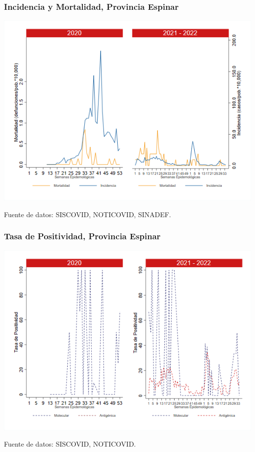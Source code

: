 \documentclass[xcolor=table]{beamer}
\begin{document}
\begin{frame}[label=Espinar]
	\frametitle{Incidencia y Mortalidad, Provincia Espinar}
	\vspace{-.5cm}
	\begin{center}
		\includegraphics[width=0.8\linewidth, trim={0cm .5cm 0cm 0.2cm},clip]{../figuras/incidencia_mortalidad_20_21_8.png}
	\end{center}
	{\tiny Fuente de datos: SISCOVID, NOTICOVID, SINADEF.}
\end{frame}

\begin{frame}
	\frametitle{Tasa de Positividad, Provincia Espinar}
	\vspace{-.5cm}
	\begin{center}
		\includegraphics[width=0.8\linewidth, trim={0cm .5cm 0cm 0.2cm},clip]{../figuras/positividad_20_21_8.png}
	\end{center}
	{\tiny Fuente de datos: SISCOVID, NOTICOVID.}
\end{frame}
\end{document}
